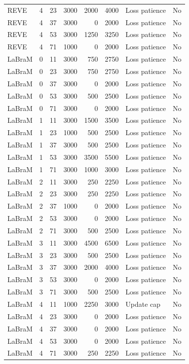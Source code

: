 \begin{longtable}{llrrrrp{1.05in}l}
REVE & 4 & 23 & 3000 & 2000 & 4000 & Loss patience & No \\
REVE & 4 & 37 & 3000 & 0 & 2000 & Loss patience & No \\
REVE & 4 & 53 & 3000 & 1250 & 3250 & Loss patience & No \\
REVE & 4 & 71 & 1000 & 0 & 2000 & Loss patience & No \\
LaBraM & 0 & 11 & 3000 & 750 & 2750 & Loss patience & No \\
LaBraM & 0 & 23 & 3000 & 750 & 2750 & Loss patience & No \\
LaBraM & 0 & 37 & 3000 & 0 & 2000 & Loss patience & No \\
LaBraM & 0 & 53 & 3000 & 500 & 2500 & Loss patience & No \\
LaBraM & 0 & 71 & 3000 & 0 & 2000 & Loss patience & No \\
LaBraM & 1 & 11 & 3000 & 1500 & 3500 & Loss patience & No \\
LaBraM & 1 & 23 & 1000 & 500 & 2500 & Loss patience & No \\
LaBraM & 1 & 37 & 3000 & 500 & 2500 & Loss patience & No \\
LaBraM & 1 & 53 & 3000 & 3500 & 5500 & Loss patience & No \\
LaBraM & 1 & 71 & 3000 & 1000 & 3000 & Loss patience & No \\
LaBraM & 2 & 11 & 3000 & 250 & 2250 & Loss patience & No \\
LaBraM & 2 & 23 & 3000 & 250 & 2250 & Loss patience & No \\
LaBraM & 2 & 37 & 1000 & 0 & 2000 & Loss patience & No \\
LaBraM & 2 & 53 & 3000 & 0 & 2000 & Loss patience & No \\
LaBraM & 2 & 71 & 3000 & 500 & 2500 & Loss patience & No \\
LaBraM & 3 & 11 & 3000 & 4500 & 6500 & Loss patience & No \\
LaBraM & 3 & 23 & 3000 & 500 & 2500 & Loss patience & No \\
LaBraM & 3 & 37 & 3000 & 2000 & 4000 & Loss patience & No \\
LaBraM & 3 & 53 & 3000 & 0 & 2000 & Loss patience & No \\
LaBraM & 3 & 71 & 3000 & 500 & 2500 & Loss patience & No \\
LaBraM & 4 & 11 & 1000 & 2250 & 3000 & Update cap & No \\
LaBraM & 4 & 23 & 3000 & 0 & 2000 & Loss patience & No \\
LaBraM & 4 & 37 & 3000 & 0 & 2000 & Loss patience & No \\
LaBraM & 4 & 53 & 3000 & 0 & 2000 & Loss patience & No \\
LaBraM & 4 & 71 & 3000 & 250 & 2250 & Loss patience & No \\
\bottomrule
\end{longtable}

